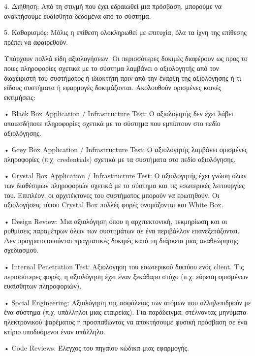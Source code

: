 4. Διήθηση: Από τη στιγμή που έχει εδραιωθεί μια πρόσβαση, μπορούμε να
ανακτήσουμε ευαίσθητα δεδομένα από το σύστημα.

5. Καθαρισμός: Μόλις η επίθεση ολοκληρωθεί με επιτυχία, όλα τα ίχνη της επίθεσης
πρέπει να αφαιρεθούν.

Υπάρχουν πολλά είδη αξιολογήσεων. Οι περισσότερες δοκιμές διαφέρουν ως προς το
ποιες πληροφορίες σχετικά με το σύστημα λαμβάνει ο αξιολογητής από τον
διαχειριστή του συστήματος ή ιδιοκτήτη πριν από την έναρξη της αξιολόγησης ή τι
είδους συστήματα ή εφαρμογές δοκιμάζονται. Ακολουθούν ορισμένες κοινές
εκτιμήσεις:

• \textlatin{Black Box Application / Infrastructure Test}: Ο αξιολογητής δεν
έχει λάβει οποιεσδήποτε πληροφορίες σχετικά με το σύστημα που εμπίπτουν στο
πεδίο αξιολόγησης.

• \textlatin{Grey Box Application / Infrastructure Test:} Ο αξιολογητής
λαμβάνει ορισμένες πληροφορίες (π.χ. \textlatin{credentials}) σχετικά με τα
συστήματα στο πεδίο αξιολόγησης.

• \textlatin{Crystal Box Application / Infrastructure Test:} Ο αξιολογητής έχει
γνώση όλων των  διαθέσιμων πληροφοριών σχετικά με το σύστημα και τις εσωτερικές
λειτουργίες του. Επιπλέον, οι αρχιτέκτονες του συστήματος μπορούν να ερωτηθούν.
Οι αξιολογήσεις τύπου \textlatin{Crystal Box} πολλές φορές ονομάζονται και
\textlatin{White Box.}

• \textlatin{Design Review}: Μια αξιολόγηση όπου η αρχιτεκτονική, τεκμηρίωση
και οι ρυθμίσεις παραμέτρων όλων των συστημάτων σε ένα περιβάλλον
επανεξετάζονται. Δεν πραγματοποιούνται πραγματικές δοκιμές κατά τη διάρκεια
μιας αναθεώρησης σχεδιασμού.

• \textlatin{Internal Penetration Test:} Αξιολόγηση του εσωτερικού δικτύου ενός
\textlatin{client}. Τις περισσότερες φορές, η αξιολόγηση έχει έναν ξεκάθαρο
στόχο (π.χ. εύρεση ορισμένων ευαίσθητων πληροφοριών).

• \textlatin{Social Engineering}: Αξιολόγηση της ασφάλειας των ατόμων που
αλληλεπιδρούν με ένα σύστημα (π.χ. υπάλληλοι μιας εταιρείας). Για παράδειγμα,
στέλνοντας μηνύματα ηλεκτρονικού ψαρέματος ή προσπαθώντας να αποκτήσουμε φυσική
πρόσβαση σε ένα κτίριο υποδυόμενοι έναν υπάλληλο.

• \textlatin{Code Reviews}: Έλεγχος του πηγαίου κώδικα μιας εφαρμογής.
